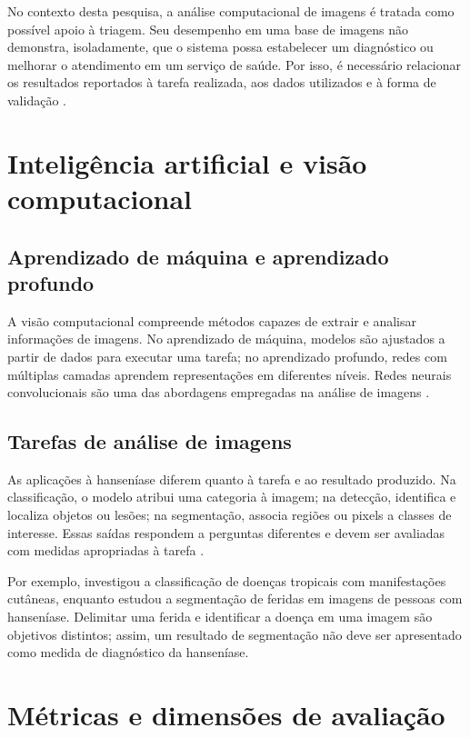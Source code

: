 No contexto desta pesquisa, a análise computacional de imagens é tratada
como possível apoio à triagem. Seu desempenho em uma base de imagens não
demonstra, isoladamente, que o sistema possa estabelecer um diagnóstico ou
melhorar o atendimento em um serviço de saúde. Por isso, é necessário
relacionar os resultados reportados à tarefa realizada, aos dados utilizados
e à forma de validação .

\section{Inteligência artificial e visão computacional}

\subsection{Aprendizado de máquina e aprendizado profundo}

A visão computacional compreende métodos capazes de extrair e analisar
informações de imagens. No aprendizado de máquina, modelos são ajustados a
partir de dados para executar uma tarefa; no aprendizado profundo, redes com
múltiplas camadas aprendem representações em diferentes níveis. Redes
neurais convolucionais são uma das abordagens empregadas na análise de
imagens \cite{lecun2015deep}.

\subsection{Tarefas de análise de imagens}

As aplicações à hanseníase diferem quanto à tarefa e ao resultado produzido.
Na classificação, o modelo atribui uma categoria à imagem; na detecção,
identifica e localiza objetos ou lesões; na segmentação, associa regiões ou
pixels a classes de interesse. Essas saídas respondem a perguntas diferentes
e devem ser avaliadas com medidas apropriadas à tarefa
.

Por exemplo,  investigou a classificação de doenças
tropicais com manifestações cutâneas, enquanto 
estudou a segmentação de feridas em imagens de pessoas com hanseníase.
Delimitar uma ferida e identificar a doença em uma imagem são objetivos
distintos; assim, um resultado de segmentação não deve ser apresentado como
medida de diagnóstico da hanseníase.

\section{Métricas e dimensões de avaliação}\label{muxe9tricas-e-dimensuxf5es-de-avaliauxe7uxe3o-do-gqm}

